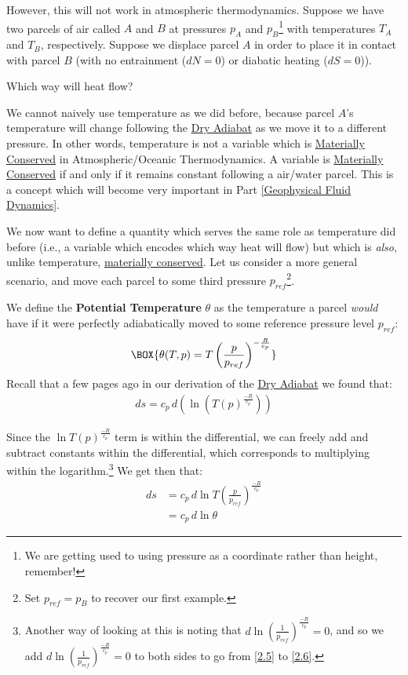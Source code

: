 However, this will not work in atmospheric thermodynamics. Suppose we have two parcels of air called $A$ and $B$ at pressures $p_A$ and $p_B$\footnote{We are getting used to using pressure as a coordinate rather than height, remember!} with temperatures $T_A$ and $T_B$, respectively. Suppose we displace parcel $A$ in order to place it in contact with parcel $B$ (with no entrainment ($dN=0$) or diabatic heating ($dS=0$)).\vspace{5mm}

Which way will heat flow?\vspace{5mm}

We cannot naively use temperature as we did before, because parcel $A$'s temperature will change following the \hyperref[Dry Adiabat]{Dry Adiabat} as we move it to a different pressure. In other words, temperature is not a variable which is \hyperref[Material Conservation]{Materially Conserved} in Atmospheric/Oceanic Thermodynamics. A variable is \hyperref[Material Conservation]{Materially Conserved} if and only if it remains constant following a air/water parcel. This is a concept which will become very important in Part \ref{Geophysical Fluid Dynamics}.

We now want to define a quantity which serves the same role as temperature did before (i.e., a variable which encodes which way heat will flow) but which is \textit{also}, unlike temperature, \hyperref[Material Conservation]{materially conserved}. Let us consider a more general scenario, and move each parcel to some third pressure $p_{ref}$\footnote{Set $p_{ref}=p_B$ to recover our first example.}. 

We define the \textbf{Potential Temperature} $\theta$ as the temperature a parcel \textit{would} have if it were perfectly adiabatically moved to some reference pressure level $p_{ref}$:
\begin{align}\label{Potential Temperature}
    \BOX{\theta(T,p)=T\left(\frac{p}{p_{ref}}\right)^{-\frac{R}{c_p}}}
\end{align}
Recall that a few pages ago in our derivation of the \hyperref[Dry Adiabat]{Dry Adiabat} we found that:
\begin{align}
    \label{2.5}
    ds=c_p\,d\left(\ln \left(T(p)^\frac{-R}{c_p}\right)\right)
\end{align}

Since the $\ln T(p)^\frac{-R}{c_p}$ term is within the differential, we can freely add and subtract constants within the differential, which corresponds to multiplying within the logarithm.\footnote{
    Another way of looking at this is noting that $d \ln \left(\frac{1}{p_{ref}}\right)^\frac{-R}{c_p}=0$, and so we add $d \ln \left(\frac{1}{p_{ref}}\right)^\frac{-R}{c_p}=0$ to both sides to go from \ref{2.5} to \ref{2.6}.
} We get then that:
\begin{align}
    \label{2.6}
    ds&=c_p\,d\ln T\left(\frac{p}{p_{ref}}\right)^\frac{-R}{c_p}
    \\
    &=c_p\,d\ln\theta
\end{align}

